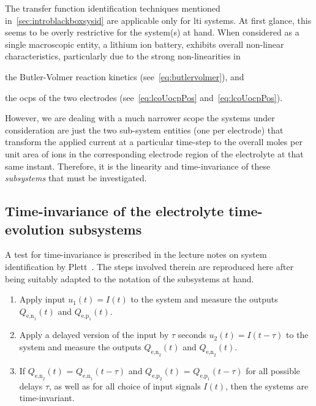 

The      transfer     function      identification     techniques      mentioned
in~\cref{sec:introblackboxsysid} are  applicable only for \gls{lti}  systems. At
first glance,  this seems to  be overly restrictive  for the system(s)  at hand.
When  considered  as  a  single  macroscopic  entity,  a  lithium  ion  battery,
exhibits  overall non-linear  characteristics,  particularly due  to the  strong
non-linearities in
\begin{enumerate*}[label=\emph{\alph*})]
    \item the Butler-Volmer reaction kinetics (see~\cref{eq:butlervolmer}), and
    \item the \glspl{ocp} of the two electrodes (see~\cref{eq:lcoUocpPos} and~\cref{eq:lcoUocpPos}).
\end{enumerate*}
However,  we are  dealing with  a much  narrower scope  \ie{} the  systems under
consideration  are just  the two  sub-system entities  (one per  electrode) that
transform the  applied current at  a particular  time-step to the  overall moles
per  unit area  of    ions in  the  corresponding  electrode region  of
the  electrolyte at  that  same  instant. Therefore,  it  is  the linearity  and
time-invariance of these \emph{subsystems} that must be investigated.

\subsection{Time-invariance of the electrolyte time-evolution subsystems}\label{subsec:timeinvariance}
A  test  for time-invariance  is  prescribed  in  the  lecture notes  on  system
identification by  Plett~\cite{PlettECE5560_02}. The steps involved  therein are
reproduced here after  being suitably adapted to the notation  of the subsystems
at hand.
\begin{enumerate}
    \item Apply input $u_1(t) = I(t)$ to the system and measure the outputs $Q_{\text{e,n}_1}\!(t)$ and $Q_{\text{e,p}_1}\!(t)$.
    \item Apply a delayed version of the input by $\tau$ seconds \ie{} $u_2(t) = I(t-\tau)$ to the system and measure the outputs $Q_{\text{e,n}_2}\!(t)$ and $Q_{\text{e,n}_2}\!(t)$.
    \item If $Q_{\text{e,n}_2}\!(t)$ = $Q_{\text{e,n}_1}\!(t-\tau)$ and
        $Q_{\text{e,p}_2}\!(t)$ = $Q_{\text{e,p}_1}\!(t-\tau)$ for all possible
        delays $\tau$, as well as for all choice of input signals $I(t)$, then the systems are time-invariant.
\end{enumerate}

